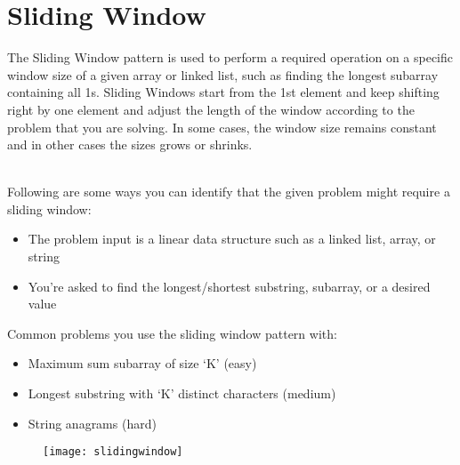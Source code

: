 \chapter{Sliding Window}

The Sliding Window pattern is used to perform a required operation on a specific window size of a given array or linked list, such as finding the longest subarray containing all 1s. Sliding Windows start from the 1st element and keep shifting right by one element and adjust the length of the window according to the problem that you are solving. In some cases, the window size remains constant and in other cases the sizes grows or shrinks.

\noindent
\\Following are some ways you can identify that the given problem might require a sliding window:

\begin{itemize}
    \item The problem input is a linear data structure such as a linked list, array, or string
    \item You’re asked to find the longest/shortest substring, subarray, or a desired value
\end{itemize}

\noindent
Common problems you use the sliding window pattern with:

\begin{itemize}
    \item Maximum sum subarray of size ‘K’ (easy)
    \item Longest substring with ‘K’ distinct characters (medium)
    \item String anagrams (hard)
\end{itemize}

\begin{figure}
	\texttt{[image: slidingwindow]}
\end{figure}




